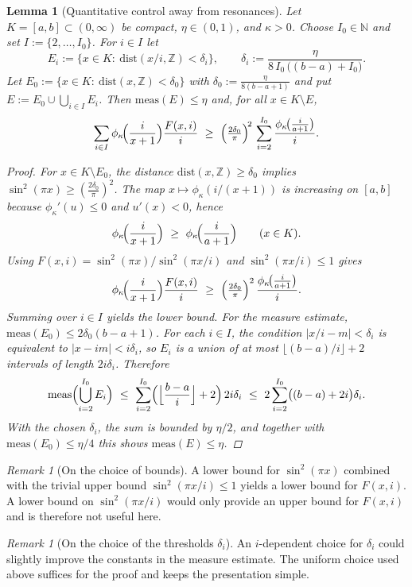 \documentclass[11pt,a4paper]{amsart}
\theoremstyle{plain}
\newtheorem{lemma}[theorem]{Lemma}
\theoremstyle{definition}
\theoremstyle{remark}
\newtheorem{remark}[theorem]{Remark}
\begin{document}
\begin{lemma}[Quantitative control away from resonances]\label{lem:constructive-lb}
Let $K=[a,b]\subset(0,\infty)$ be compact, $\eta\in(0,1)$, and $\kappa>0$. Choose $I_0\in\mathbb N$ and set $I:=\{2,\dots,I_0\}$. For $i\in I$ let
\[
E_i:=\{x\in K:\ \mathrm{dist}(x/i,\mathbb Z)<\delta_i\},\qquad 
\delta_i:=\frac{\eta}{8\,I_0\,\bigl((b-a)+I_0\bigr)}.
\]
Let $E_0:=\{x\in K:\ \mathrm{dist}(x,\mathbb Z)<\delta_0\}$ with $\delta_0:=\frac{\eta}{8(b-a+1)}$ and put $E:=E_0\cup\bigcup_{i\in I}E_i$. Then $\mathrm{meas}(E)\le \eta$ and, for all $x\in K\setminus E$,
\[
\sum_{i\in I}\phi_{\kappa}\!\Bigl(\frac{i}{x+1}\Bigr)\frac{F(x,i)}{i}
\ \ge\ 
\Bigl(\tfrac{2\delta_0}{\pi}\Bigr)^{\!2}\,
\sum_{i=2}^{I_0}\frac{\phi_{\kappa}\!\bigl(\tfrac{i}{a+1}\bigr)}{i}.
\]

\begin{proof}
For $x\in K\setminus E_0$, the distance $\mathrm{dist}(x,\mathbb Z)\ge \delta_0$ implies $\sin^2(\pi x)\ge (\tfrac{2\delta_0}{\pi})^2$. The map $x\mapsto \phi_\kappa(i/(x+1))$ is increasing on $[a,b]$ because $\phi_\kappa'(u)\le 0$ and $u'(x)<0$, hence
\[
\phi_\kappa\!\Bigl(\frac{i}{x+1}\Bigr)\ \ge\ \phi_\kappa\!\Bigl(\frac{i}{a+1}\Bigr)\qquad(x\in K).
\]
Using $F(x,i)=\sin^2(\pi x)/\sin^2(\pi x/i)$ and $\sin^2(\pi x/i)\le 1$ gives
\[
\phi_\kappa\!\Bigl(\frac{i}{x+1}\Bigr)\frac{F(x,i)}{i}
\ \ge\
\Bigl(\tfrac{2\delta_0}{\pi}\Bigr)^2\,\frac{\phi_\kappa\!\bigl(\tfrac{i}{a+1}\bigr)}{i}.
\]
Summing over $i\in I$ yields the lower bound. For the measure estimate, $\mathrm{meas}(E_0)\le 2\delta_0(b-a+1)$. For each $i\in I$, the condition $|x/i-m|<\delta_i$ is equivalent to $|x-im|<i\delta_i$, so $E_i$ is a union of at most $\lfloor(b-a)/i\rfloor+2$ intervals of length $2i\delta_i$. Therefore
\[
\mathrm{meas}\Bigl(\bigcup_{i=2}^{I_0}E_i\Bigr)\ \le\ \sum_{i=2}^{I_0}\Bigl(\Bigl\lfloor\frac{b-a}{i}\Bigr\rfloor+2\Bigr)\,2i\delta_i
\ \le\ 2\sum_{i=2}^{I_0}\bigl((b-a)+2i\bigr)\delta_i.
\]
With the chosen $\delta_i$, the sum is bounded by $\eta/2$, and together with $\mathrm{meas}(E_0)\le \eta/4$ this shows $\mathrm{meas}(E)\le \eta$.
\end{proof}
\end{lemma}

\begin{remark}[On the choice of bounds]
A lower bound for $\sin^2(\pi x)$ combined with the trivial upper bound $\sin^2(\pi x/i)\le 1$ yields a lower bound for $F(x,i)$. A lower bound on $\sin^2(\pi x/i)$ would only provide an upper bound for $F(x,i)$ and is therefore not useful here.
\end{remark}
\begin{remark}[On the choice of the thresholds $\delta_i$]
An $i$-dependent choice for $\delta_i$ could slightly improve the constants in the measure estimate. The uniform choice used above suffices for the proof and keeps the presentation simple.
\end{remark}
\end{document}
